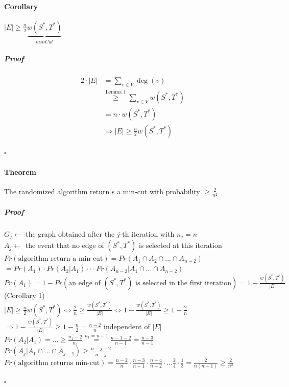 \paragraph{Corollary} $|E| \geq \frac{n}{2}\underbrace{w(S^*,T^*)}_{minCut}$
\subparagraph{Proof}
\begin{align*}
	2 \cdot |E| &= \sum_{v \in V}\deg(v) \\
	&\stackrel{\text{Lemma 1}}{\geq} \sum_{v \in V} w(S^*,T^*) \\
	&= n \cdot w(S^*,T^*) \\
	&\Rightarrow |E| \geq \frac{n}{2} w(S^*,T^*)
\end{align*}
\begin{flushright}
	$\square$
\end{flushright}
\paragraph{Theorem} The randomized algorithm return s a min-cut with probability $\geq \frac{2}{n^2}$
\subparagraph{Proof} $G_j \leftarrow$ the graph obtained after the $j$-th iteration with $n_j = n$ \\
$A_j \leftarrow$ the event that no edge of $(S^*,T^*)$ is selected at this iteration\\
$Pr(\text{algorithm return a min-cut}) = Pr(A_1 \cap A_2 \cap ... \cap A_{n-2})$ 
$=Pr(A_1) \cdot Pr(A_2|A_1) \cdot \cdot \cdot Pr(A_{n-2}|A_1 \cap ... \cap A_{n-2})$ \\
$Pr(A_1) = 1 - Pr(\text{an edge of }(S^*,T^*) \text{ is selected in the first iteration}) = 1- \frac{w(S^*,T^*)}{|E|}$ (Corollary 1) \\
$|E| \geq \frac{n}{2}w(S^*,T^*) \Leftrightarrow \frac{2}{n} \geq \frac{w(S^*,T^*)}{|E|} \Leftrightarrow 1 - \frac{w(S^*,T^*)}{|E|} \geq 1 - \frac{2}{n}$ \\
$\Rightarrow 1 - \frac{w(S^*,T^*)}{|E|} \geq 1 - \frac{n}{2} = \frac{n-2}{n}$ independent of $|E|$ \\
$Pr(A_2|A_1) = ...  \geq \frac{n_1-2}{n_1} \stackrel{n_1=n-1}{=} \frac{n-1-2}{n-1} = \frac{n-3}{n-1} $ \\
$Pr(A_j|A_1 \cap ... \cap A_{j-1}) \geq \frac{n-j-2}{n-j}$ \\
$Pr(\text{algorithm returns min-cut}) = \frac{n-2}{n} \cdot  \frac{n-3}{n-1} \cdot \frac{n-4}{n-2} \cdot ... \frac{2}{4} \cdot \frac{1}{3} = \frac{2}{n(n-1)} \geq \frac{2}{n^2}$
\begin{flushright}
	$\square$
\end{flushright}
